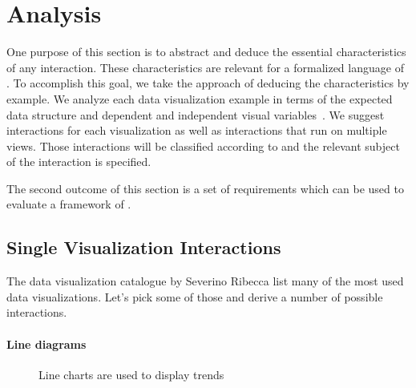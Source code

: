 \clearpage
\section{Analysis}\label{sec:analysis}
One purpose of this section is to abstract and deduce the essential characteristics of any interaction.
These characteristics are relevant for a formalized language of \cmvs{}.
To accomplish this goal, we take the approach of deducing the characteristics by example.
We analyze each data visualization example in terms of the expected data structure and dependent and independent visual variables~\cite{Bertin2010}.
We suggest interactions for each visualization as well as interactions that run on multiple views.
Those interactions will be classified according to \textcite{Yi2007} and the relevant subject of the interaction is specified.

The second outcome of this section is a set of requirements which can be used to evaluate a framework of \cmvs{}.


\subsection{Single Visualization Interactions}\label{sec:analysis:examples}

The data visualization catalogue by Severino Ribecca list many of the most used data visualizations\cite{VisualizationCatalogue2017}.
Let's pick some of those and derive a number of possible interactions.



\paragraph{Line diagrams}
\begin{figure}
  \begin{center}
    \qquad
  \end{center}
  \caption{Line charts are used to display trends}\label{fig:concept:chart-types:line-diagrams}
\end{figure}

